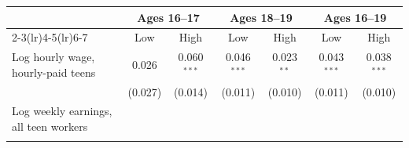 \begin{tabular}{lcccccc}
\toprule
 & \multicolumn{2}{c}{Ages 16--17} & \multicolumn{2}{c}{Ages 18--19} & \multicolumn{2}{c}{Ages 16--19} \\
\cmidrule(lr){2-3}\cmidrule(lr){4-5}\cmidrule(lr){6-7}
 & Low & High & Low & High & Low & High \\
\midrule
Log hourly wage, hourly-paid teens & 0.026 & 0.060$^{***}$ & 0.046$^{***}$ & 0.023$^{**}$ & 0.043$^{***}$ & 0.038$^{***}$ \\
 & (0.027) & (0.014) & (0.011) & (0.010) & (0.011) & (0.010) \\
Log weekly earnings, all teen workers &  &  &  &  &  &  \\
 &  &  &  &  &  &  \\
\bottomrule
\end{tabular}
